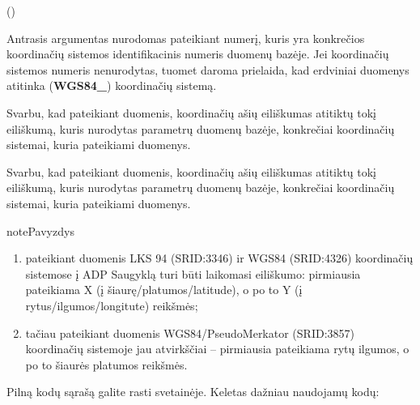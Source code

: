\documentclass[letterpaper,10pt,lithuanian]{sphinxmanual}
\begin{document}
\begin{fulllineitems}
\sphinxAtStartPar
{} ()

\sphinxAtStartPar
Antrasis  argumentas nurodomas pateikiant  numerį, kuris yra
konkrečios koordinačių sistemos identifikacinis numeris  duomenų
bazėje. Jei koordinačių sistemos numeris nenurodytas, tuomet daroma
prielaida, kad erdviniai duomenys atitinka  ({\color{red}\bfseries{}WGS84\_}) koordinačių
sistemą.

\sphinxAtStartPar
Svarbu, kad pateikiant duomenis, koordinačių ašių eiliškumas atitiktų tokį
eiliškumą, kuris nurodytas  parametrų duomenų bazėje, konkrečiai
koordinačių sistemai, kuria pateikiami duomenys.

\sphinxAtStartPar
Svarbu, kad pateikiant duomenis, koordinačių ašių eiliškumas atitiktų tokį
eiliškumą, kuris nurodytas  parametrų duomenų bazėje, konkrečiai
koordinačių sistemai, kuria pateikiami duomenys.

\begin{sphinxadmonition}{note}{Pavyzdys}
\begin{enumerate}
%
\item {} 
\sphinxAtStartPar
pateikiant duomenis  LKS 94 (SRID:3346) ir WGS84 (SRID:4326)
koordinačių sistemose į ADP Saugyklą turi būti laikomasi eiliškumo:
pirmiausia pateikiama X (į šiaurę/platumos/latitude), o po to Y (į
rytus/ilgumos/longitute) reikšmės;

\item {} 
\sphinxAtStartPar
tačiau pateikiant duomenis  WGS84/Pseudo\sphinxhyphen{}Merkator (SRID:3857)
koordinačių sistemoje jau atvirkščiai – pirmiausia pateikiama  rytų
ilgumos, o po to šiaurės platumos reikšmės.

\end{enumerate}
\end{sphinxadmonition}

\sphinxAtStartPar
Pilną  kodų sąrašą galite rasti  svetainėje. Keletas
dažniau naudojamų  kodų:



\end{fulllineitems}
\end{document}
